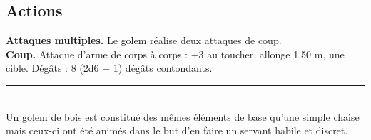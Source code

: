 \begin{figure*}[hbp]
{\begin{minipage}[c]{.45\linewidth}
    \subsection*{Actions}
    {\bfseries Attaques multiples.} Le golem réalise deux attaques de coup.\\
    {\bfseries Coup.} Attaque d'arme de corps à corps : +3 au toucher, allonge 1,50 m, une 
               cible. Dégâts : 8 (2d6 + 1) dégâts contondants.\\
    \noindent\rule{\textwidth}{1pt} \\
    Un golem de bois est constitué des mêmes éléments de base qu'une simple chaise 
    mais ceux-ci ont été animés dans le but d'en faire un servant habile et discret.
  \end{minipage}
}%
\end{figure*}
